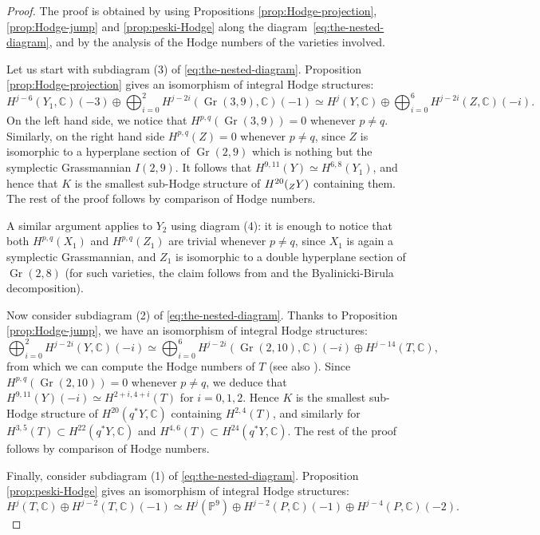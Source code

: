 \documentclass[JEP,XML,SOM,Unicode,NoEqCountersInSection]{cedram}
\newcommand{\NoChangel}[1]{%
\expandafter\let\csname old\string#1\endcsname=#1
\let#1=\relax
\newcommand{#1}{\mathcode`l="716C\csname old\string#1\endcsname\mathcode`l="7160 }%
}
\newcommand{\Bl}{\mathrm{Bl}}\NoChangel{\Bl}
\theoremstyle{plain}
\theoremstyle{definition}
\DeclareMathOperator{\Gr}{Gr}
\newcommand{\CC}{\mathbb{C}}
\newcommand{\PP}{\mathbb{P}}
\begin{document}
\begin{proof}
The proof is obtained by using Propositions \ref{prop:Hodge-projection}, \ref{prop:Hodge-jump} and
\ref{prop:peski-Hodge} along the diagram~\eqref{eq:the-nested-diagram}, and by the analysis of the Hodge numbers of the varieties involved.

Let us start with subdiagram (3) of \eqref{eq:the-nested-diagram}. Proposition \ref{prop:Hodge-projection} gives an isomorphism of integral Hodge structures:
\[
H^{j-6}(Y_1,\CC)(-3) \oplus \bigoplus_{i=0}^2 H^{j-2i}(\Gr(3,9),\CC)(-1) \simeq
H^j(Y,\CC) \oplus \bigoplus_{i=0}^{6}H^{j-2i}(Z,\CC)(-i).
\]
On the left hand side, we notice that $H^{p,q}(\Gr(3,9))=0$ whenever $p \neq q$.
Similarly, on the right hand side $H^{p,q}(Z)=0$ whenever $p \neq q$, since $Z$ is isomorphic to a hyperplane
section of $\Gr(2,9)$ which is nothing but the symplectic Grassmannian $I(2,9)$.
It follows that $H^{9,11}(Y) \simeq H^{6,8}(Y_1)$, and hence that $K$ is the smallest sub-Hodge structure
of $H^{20}(\Bl_Z Y)$ containing them. The rest of the proof follows by comparison of Hodge numbers.

A similar argument applies to $Y_2$ using diagram (4): it is enough to notice that both $H^{p,q}(X_1)$ and $H^{p,q}(Z_1)$ are trivial
whenever $p \neq q$, since $X_1$ is again a symplectic Grassmannian,
and $Z_1$ is isomorphic to a double hyperplane section of $\Gr(2,8)$
(for such varieties, the claim follows from \cite[2.10]{vlad-bi} and the Byalinicki-Birula
decomposition).

Now consider subdiagram (2) of \eqref{eq:the-nested-diagram}. Thanks to Proposition \ref{prop:Hodge-jump}, we have an isomorphism of integral Hodge structures:
\begin{equation*}\label{eq:hodge-Y-and-T}
\bigoplus_{i=0}^2 H^{j-2i}(Y,\CC)(-i) \simeq \bigoplus_{i=0}^6 H^{j-2i}(\Gr(2,10),\CC)(-i) \oplus H^{j-14}(T,\CC),
\end{equation*}
from which we can compute the Hodge numbers of $T$ (see also \cite[Prop.\,3.27]{fm}).
Since $H^{p,q}(\Gr(2,10))=0$ whenever $p\neq q$, we deduce that $H^{9,11}(Y)(-i) \simeq H^{2+i,4+i}(T)$ for $i=0,1,2$. Hence $K$ is the smallest sub-Hodge structure of $H^{20}(q^* Y,\CC)$ containing $H^{2,4}(T)$, and similarly for $H^{3,5}(T) \subset H^{22}(q^*Y,\CC)$ and $H^{4,6}(T) \subset H^{24}(q^*Y,\CC)$.
The rest of the proof follows by comparison of Hodge numbers.

Finally, consider subdiagram (1) of \eqref{eq:the-nested-diagram}. Proposition \ref{prop:peski-Hodge} gives an isomorphism of integral Hodge structures:
\begin{equation*}\label{eq:hodge-P-and-T}
H^j(T,\CC) \oplus H^{j-2}(T,\CC)(-1) \simeq H^j(\PP^9) \oplus H^{j-2}(P,\CC)(-1) \oplus H^{j-4}(P,\CC)(-2).
\end{equation*}


\end{proof}
\end{document}
